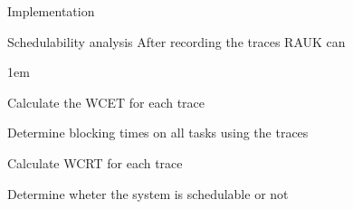 \begin{frame}{Implementation}
    \begin{block}{Schedulability analysis}
        After recording the traces RAUK can
        \begin{itemize-size}{1em}
            \item Calculate the WCET for each trace
            \item Determine blocking times on all tasks using the traces
            \item Calculate WCRT for each trace
            \item Determine wheter the system is schedulable or not
        \end{itemize-size}  
    \end{block}
\end{frame}
